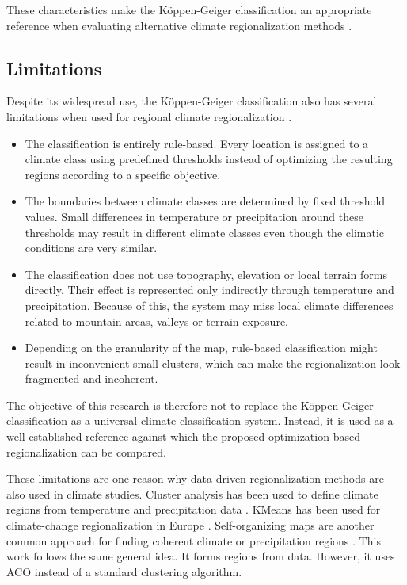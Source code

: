 \documentclass[11pt]{article}
\begin{document}
These characteristics make the Köppen-Geiger classification an appropriate reference when evaluating alternative climate regionalization methods \cite{peel2007,beck2018}.

\subsection{Limitations}

Despite its widespread use, the Köppen-Geiger classification also has several limitations when used for regional climate regionalization \cite{fovell1993,swenson2019}.
\begin{itemize}
  \item The classification is entirely rule-based. Every location is assigned to a climate class using predefined thresholds instead of optimizing the resulting regions according to a specific objective.
  \item The boundaries between climate classes are determined by fixed threshold values. Small differences in temperature or precipitation around these thresholds may result in different climate classes even though the climatic conditions are very similar.
  \item The classification does not use topography, elevation or local terrain forms directly. Their effect is represented only indirectly through temperature and precipitation. Because of this, the system may miss local climate differences related to mountain areas, valleys or terrain exposure.
  \item Depending on the granularity of the map, rule-based classification might result in inconvenient small clusters, which can make the regionalization look fragmented and incoherent.
\end{itemize}

The objective of this research is therefore not to replace the Köppen-Geiger classification as a universal climate classification system. Instead, it is used as a well-established reference against which the proposed optimization-based regionalization can be compared.

These limitations are one reason why data-driven regionalization methods are also used in climate studies. Cluster analysis has been used to define climate regions from temperature and precipitation data \cite{fovell1993}. KMeans has been used for climate-change regionalization in Europe \cite{carvalho2016}. Self-organizing maps are another common approach for finding coherent climate or precipitation regions \cite{sheridan2011,swenson2019}. This work follows the same general idea. It forms regions from data. However, it uses ACO instead of a standard clustering algorithm.
\end{document}
